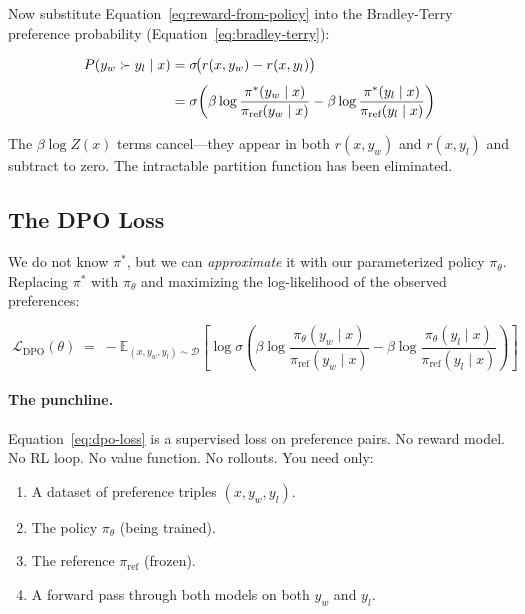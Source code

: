 Now substitute Equation~\ref{eq:reward-from-policy} into the Bradley-Terry preference probability (Equation~\ref{eq:bradley-terry}):

\begin{align}
P(y_w \succ y_l \mid x) &= \sigma\!\bigl(r(x, y_w) - r(x, y_l)\bigr) \notag \\[4pt]
&= \sigma\!\left(\beta \log \frac{\pi^*(y_w \mid x)}{\pi_{\text{ref}}(y_w \mid x)} - \beta \log \frac{\pi^*(y_l \mid x)}{\pi_{\text{ref}}(y_l \mid x)}\right) \label{eq:dpo-cancel}
\end{align}

The $\beta \log Z(x)$ terms cancel---they appear in both $r(x, y_w)$ and $r(x, y_l)$ and subtract to zero. The intractable partition function has been eliminated.

\subsection{The DPO Loss}

We do not know $\pi^*$, but we can \emph{approximate} it with our parameterized policy $\pi_\theta$. Replacing $\pi^*$ with $\pi_\theta$ and maximizing the log-likelihood of the observed preferences:

\begin{equation}
\label{eq:dpo-loss}
\boxed{\;\mathcal{L}_{\text{DPO}}(\theta) \;=\; -\mathbb{E}_{(x, y_w, y_l) \sim \mathcal{D}} \left[\log \sigma\!\left(\beta \log \frac{\pi_\theta(y_w \mid x)}{\pi_{\text{ref}}(y_w \mid x)} - \beta \log \frac{\pi_\theta(y_l \mid x)}{\pi_{\text{ref}}(y_l \mid x)}\right)\right]\;}
\end{equation}

\paragraph{The punchline.} Equation~\ref{eq:dpo-loss} is a supervised loss on preference pairs. No reward model. No RL loop. No value function. No rollouts. You need only:

\begin{enumerate}[nosep]
  \item A dataset of preference triples $(x, y_w, y_l)$.
  \item The policy $\pi_\theta$ (being trained).
  \item The reference $\pi_{\text{ref}}$ (frozen).
  \item A forward pass through both models on both $y_w$ and $y_l$.
\end{enumerate}

